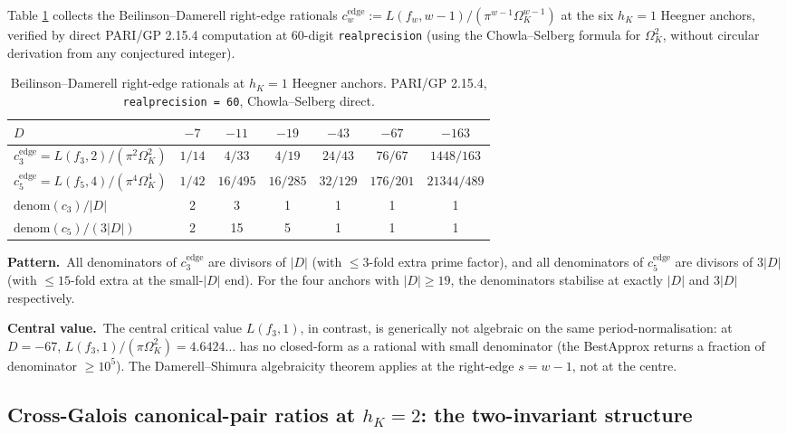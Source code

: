 \documentclass[11pt]{amsart}
\theoremstyle{definition}
\theoremstyle{remark}
\begin{document}
Table \ref{tab:beilinson-integers} collects the Beilinson--Damerell
right-edge rationals
$c_w^{\mathrm{edge}} := L(f_w, w-1)/(\pi^{w-1} \Omega_K^{w-1})$
at the six $h_K = 1$ Heegner anchors,
verified by direct PARI/GP 2.15.4 computation at 60-digit
\texttt{realprecision} (using the Chowla--Selberg formula for
$\Omega_K^2$, without circular derivation from any conjectured
integer).

\begin{table}[h]\centering
\caption{Beilinson--Damerell right-edge rationals at $h_K = 1$
Heegner anchors. PARI/GP 2.15.4, \texttt{realprecision = 60},
Chowla--Selberg direct.}
\label{tab:beilinson-integers}
\begin{tabular}{l|cccccc}
\toprule
$D$ & $-7$ & $-11$ & $-19$ & $-43$ & $-67$ & $-163$ \\
\midrule
$c_3^{\mathrm{edge}} = L(f_3,2)/(\pi^2 \Omega_K^2)$
  & $1/14$ & $4/33$ & $4/19$ & $24/43$ & $76/67$ & $1448/163$ \\
$c_5^{\mathrm{edge}} = L(f_5,4)/(\pi^4 \Omega_K^4)$
  & $1/42$ & $16/495$ & $16/285$ & $32/129$ & $176/201$ & $21344/489$ \\
\midrule
$\mathrm{denom}(c_3)/|D|$
  & 2 & 3 & 1 & 1 & 1 & 1 \\
$\mathrm{denom}(c_5)/(3|D|)$
  & 2 & 15 & 5 & 1 & 1 & 1 \\
\bottomrule
\end{tabular}
\end{table}

\noindent\textbf{Pattern.}~All denominators of $c_3^{\mathrm{edge}}$
are divisors of $|D|$ (with $\le 3$-fold extra prime factor),
and all denominators of $c_5^{\mathrm{edge}}$ are divisors of
$3 |D|$ (with $\le 15$-fold extra at the small-$|D|$ end). For
the four anchors with $|D| \ge 19$, the denominators stabilise
at exactly $|D|$ and $3 |D|$ respectively.

\noindent\textbf{Central value.}~The central critical value
$L(f_3, 1)$, in contrast, is generically not algebraic on the same
period-normalisation: at $D = -67$,
$L(f_3, 1) / (\pi \Omega_K^2) = 4.6424\ldots$ has no closed-form as
a rational with small denominator (the BestApprox returns a fraction
of denominator $\ge 10^5$). The Damerell--Shimura algebraicity
theorem applies at the right-edge $s = w - 1$, not at the centre.

\subsection{Cross-Galois canonical-pair ratios at $h_K=2$:
the two-invariant structure}\label{ss:two-invariant}
\end{document}

